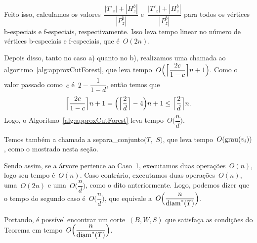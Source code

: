 	Feito isso, calculamos os 
	valores~${\dfrac{|T'_{z}|+|H_{z}^b|}{|P^b_{z}|}}$
	e~${\dfrac{|T'_{z}|+|H_{z}^b|}{|P^b_{z}|}}$
	para todos os vértices b-especiais e f-especiais, respectivamente.
	Isso leva tempo linear no número de vértices b-especiais e f-especiais,
	que é~$O(2n)$.

	Depois disso, tanto no caso a) quanto no b), realizamos uma chamada ao 
	algoritmo~\ref{alg:approxCutForest}, que leva 
	tempo~$O\Big(\ceil[\Big]{ \dfrac{2c}{1-c}} n+1\Big)$.
	Como o valor passado como~$c$ é~$2-\dfrac{1}{1-d}$, então
	temos que
	$$ \ceil[\Big]{\dfrac{2c}{1-c}} n+1 
	= \Big(\ceil[\Big]{\dfrac{2}{d}}-4 \Big)n+1 
	\le \ceil[\Big]{\dfrac{2}{d}}n.$$ 
	Logo, o
	Algoritmo~\ref{alg:approxCutForest} leva tempo~$O\Big(\dfrac{n}{d}\Big)$.

	Temos também a chamada a {\sc separa\_conjunto}$(T,$ $S)$, que 
	leva tempo~$O(\grau(v_i))$, como o mostrado nesta seção.
	
	Sendo assim, se a árvore pertence ao Caso~1, executamos duas 
	operações~$O(n)$,
	logo seu tempo é~$O(n)$.
	Caso contrário, executamos duas operações~$O(n)$, uma~$O(2n)$
	e uma~$O\Big(\dfrac{n}{d}\Big)$, como o dito anteriormente. 
	Logo, podemos dizer que o
	tempo do segundo caso é~$O\Big(\dfrac{n}{d}\Big)$, que 
	equivale a~$O\Big(\dfrac{n}{\diam^*(T)}\Big)$.

	Portando, é possível encontrar um corte~$(B,W,S)$
	que satisfaça as condições do Teorema em 
	tempo~$O\Big(\dfrac{n}{\diam^*(T)}\Big)$.
